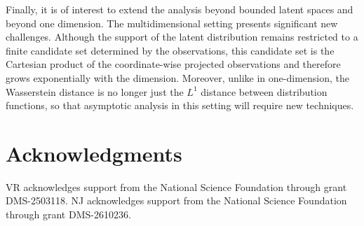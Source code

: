 \documentclass[english, 11pt]{article}
\theoremstyle{plain}
\theoremstyle{definition}
\theoremstyle{remark}
\begin{document}
Finally, it is of interest to extend the analysis beyond bounded latent spaces and beyond one dimension. 
The multidimensional setting presents significant new challenges. Although the support of the latent distribution remains restricted to a finite candidate set determined by the observations, this candidate set is the Cartesian product of the coordinate-wise projected observations and therefore grows exponentially with the dimension. %
Moreover, unlike in one-dimension, the Wasserstein distance is no longer just the $L^1$ distance between distribution functions, so that asymptotic analysis in this setting will require new techniques.


\section*{Acknowledgments}
VR acknowledges support from the National Science Foundation through grant DMS-2503118.
NJ acknowledges support from the National Science Foundation through grant DMS-2610236.



\end{document}
